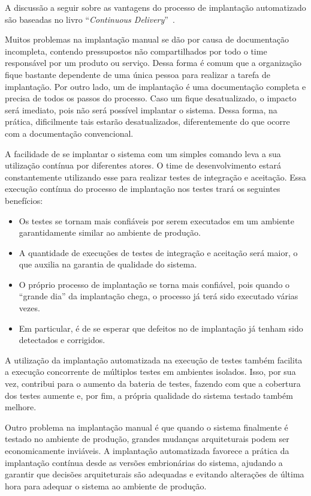 A discussão a seguir sobre as vantagens do processo de implantação automatizado
são baseadas no livro ``\emph{Continuous Delivery}''~\cite{Humble2011Continuous}.

Muitos problemas na implantação manual se dão por causa de documentação incompleta,
contendo pressupostos não compartilhados por todo o time responsável por um produto ou serviço.
Dessa forma é comum que a organização fique bastante dependente de uma única
pessoa para realizar a tarefa de implantação.
Por outro lado, um \script de implantação é uma documentação completa e precisa de todos os passos
do processo. Caso um \script fique desatualizado, o impacto será imediato, pois
não será possível implantar o sistema. Dessa forma, na prática,
dificilmente tais \scripts estarão desatualizados,
diferentemente do que ocorre com a documentação convencional.

A facilidade de se implantar o sistema com um simples comando
leva a sua utilização contínua por diferentes atores.
O time de desenvolvimento estará constantemente utilizando esse \script 
para realizar testes de integração e aceitação. 
Essa execução contínua do processo de implantação nos testes trará os seguintes benefícios:

\begin{itemize}
\item Os testes se tornam mais confiáveis por serem executados em um ambiente garantidamente similar ao ambiente de produção.
\item A quantidade de execuções de testes de integração e aceitação será maior, o que auxilia na garantia de qualidade do sistema.
\item O próprio processo de implantação se torna mais confiável, pois quando o ``grande dia'' da implantação chega, o processo já terá sido executado várias vezes.
\item Em particular, é de se esperar que defeitos no \script de implantação já tenham sido detectados e corrigidos.
\end{itemize}

A utilização da implantação automatizada na execução de testes também
facilita a execução concorrente de múltiplos testes em ambientes isolados.
Isso, por sua vez, contribui para o aumento da bateria de testes, fazendo com que
a cobertura dos testes aumente e, por fim, a própria qualidade do sistema testado também melhore.

Outro problema na implantação manual é que quando o sistema finalmente é testado
no ambiente de produção, grandes mudanças arquiteturais podem ser economicamente inviáveis.
A implantação automatizada favorece a prática da implantação contínua desde as versões
embrionárias do sistema, ajudando a garantir que decisões arquiteturais são adequadas
e evitando alterações de última hora para adequar o sistema ao ambiente de produção.

